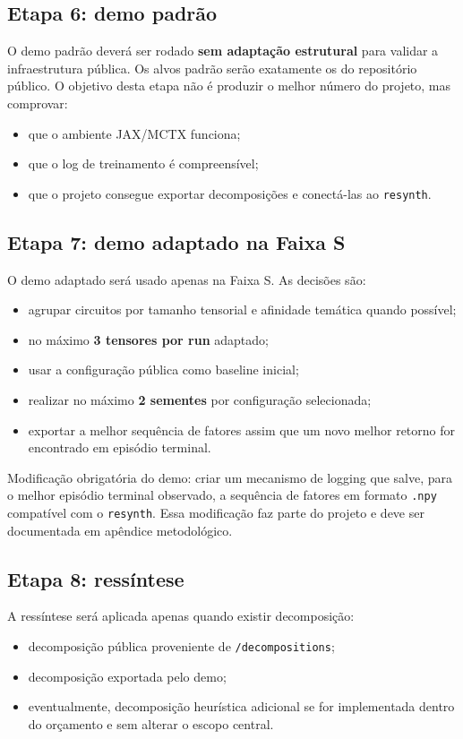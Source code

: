 \documentclass[a4paper,11pt]{article}
\begin{document}
\subsection*{Etapa 6: demo padrão}

O demo padrão deverá ser rodado \textbf{sem adaptação estrutural} para validar a infraestrutura pública. Os alvos padrão serão exatamente os do repositório público. O objetivo desta etapa não é produzir o melhor número do projeto, mas comprovar:
\begin{itemize}
  \item que o ambiente JAX/MCTX funciona;
  \item que o log de treinamento é compreensível;
  \item que o projeto consegue exportar decomposições e conectá-las ao \texttt{resynth}.
\end{itemize}

\subsection*{Etapa 7: demo adaptado na Faixa S}

O demo adaptado será usado apenas na Faixa S. As decisões são:
\begin{itemize}
  \item agrupar circuitos por tamanho tensorial e afinidade temática quando possível;
  \item no máximo \textbf{3 tensores por run} adaptado;
  \item usar a configuração pública como baseline inicial;
  \item realizar no máximo \textbf{2 sementes} por configuração selecionada;
  \item exportar a melhor sequência de fatores assim que um novo melhor retorno for encontrado em episódio terminal.
\end{itemize}

Modificação obrigatória do demo: criar um mecanismo de logging que salve, para o melhor episódio terminal observado, a sequência de fatores em formato \texttt{.npy} compatível com o \texttt{resynth}. Essa modificação faz parte do projeto e deve ser documentada em apêndice metodológico.

\subsection*{Etapa 8: ressíntese}

A ressíntese será aplicada apenas quando existir decomposição:
\begin{itemize}
  \item decomposição pública proveniente de \texttt{/decompositions};
  \item decomposição exportada pelo demo;
  \item eventualmente, decomposição heurística adicional se for implementada dentro do orçamento e sem alterar o escopo central.
\end{itemize}
\end{document}
